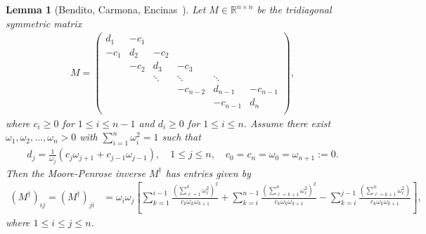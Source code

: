 \documentclass[11pt,a4paper]{amsart}
\newtheorem{lemma}[theorem]{Lemma}
\begin{document}
\begin{lemma}[Bendito, Carmona, Encinas~\cite{bendito2010generalized}]\label{lem:inverting-tridiagonal}
    Let $M\in\mathbb{R}^{n\times n}$ be the tridiagonal symmetric matrix
        \begin{align*}
            M = \begin{pmatrix}
                d_1 & -c_1 & & & & \\
                -c_1 & d_2 & -c_2 & & & \\
                & -c_2 & d_3 & -c_3 & & \\
                & &\ddots &\ddots &\ddots &\\
                & & &-c_{n-2}&d_{n-1}&-c_{n-1}\\
                & & & &-c_{n-1}&d_n\\
            \end{pmatrix},
        \end{align*}
    where $c_i \geq 0$ for $1\leq i \leq n-1$ and $d_i \geq 0$ for $1\leq i \leq n$. Assume there exist $\omega_1, \omega_2, \dotsc,\omega_n >0$ with $\sum_{i=1}^n\omega_i^2 = 1$ such that
        \begin{align}\label{eq:omega-js}
            d_j = \frac{1}{\omega_j}\left(c_j\omega_{j+1} + c_{j-1}\omega_{j-1}\right),\quad 1\leq j\leq n, \quad c_0 = c_n = \omega_0 = \omega_{n+1} := 0.
        \end{align}
    Then the Moore-Penrose inverse $M^\dagger$ has entries given by
        {\footnotesize\begin{align*}
            (M^\dagger)_{ij} =  (M^\dagger)_{ji} &= \omega_i \omega_j \left[
                \sum_{k=1}^{i-1} 
                \frac{\left( \sum_{\ell=1}^{k} \omega_\ell^2 \right)^2}{c_k \omega_k \omega_{k+1}}
                +
                \sum_{k=i}^{n-1}
                \frac{\left( \sum_{\ell=k+1}^{n} \omega_\ell^2 \right)^2}{c_k \omega_k \omega_{k+1}}
                -
                \sum_{k=i}^{j-1}
                \frac{\left( \sum_{\ell=k+1}^{n} \omega_\ell^2 \right)}{c_k \omega_k \omega_{k+1}}
                \right],
        \end{align*}}
    where $1\leq i\leq j\leq n$.
\end{lemma}
\end{document}
